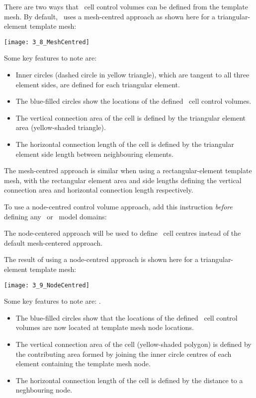 There are two ways that \mf\ cell control volumes can be defined from the template mesh.  By default, \mut\ uses a mesh-centred approach as shown here for a triangular-element template mesh:

    \texttt{[image: 3\_8\_MeshCentred]}

Some key features to note are:
    \label{page:MeshCentredApproach}
    \label{page:MeshCentredApproach}
\begin{itemize}
    \item Inner circles (dashed circle in yellow triangle), which are tangent to all three element sides, are defined for each triangular element.  
    \item The blue-filled circles show the locations of the defined \mf\ cell control volumes.
    \item The vertical connection area of the cell is defined by the triangular element area (yellow-shaded triangle).
    \item The horizontal connection length of the cell is defined by the triangular element side length between neighbouring elements.
\end{itemize}

The mesh-centred approach is similar when using a  rectangular-element template mesh, with the rectangular element area and side lengths defining the vertical connection area and horizontal connection length respectively.

To use a node-centred control volume approach, add this instruction {\em before} defining any \gwf\ or \swf\ model domains:

    {The node-centered approach will be used to define \mf\ cell centres instead of the default mesh-centered approach.
     }

The result of using a node-centred approach is shown here for a triangular-element template mesh:

    \texttt{[image: 3\_9\_NodeCentred]}

Some key features to note are:
    \label{page:NodeCentredApproach}
    \label{page:NodeCentredApproach}.
\begin{itemize}
    \item The blue-filled circles show that the locations of the defined \mf\ cell control volumes are now located at template mesh node locations.
    \item The vertical connection area of the cell (yellow-shaded polygon) is defined by the contributing area formed by joining the inner circle centres of each element containing the template mesh node.         \label{page:NodeCentredApproach}
    \item The horizontal connection length of the cell is defined by the distance to a neghbouring node.
\end{itemize}




